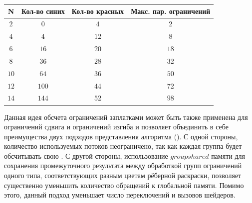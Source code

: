 		\noindent %
	\begin{minipage}{\textwidth}
		\vspace{\mfloatsep} %
		\centering\small
		\label{tab:chunkSize}
		\begin{tabular}{|c|c|c|c|}
			\hline
			\textbf{N} & \textbf{Кол-во синих} & \textbf{Кол-во красных} & \textbf{Макс. пар. ограничений}\\
			\hline
				$2$ & $0$ & $4$ & $2$\\ \hline
				$4$ & $4$ & $12$ & $8$\\ \hline
				$6$ & $16$ & $20$ & $18$\\ \hline
				$8$ & $36$ & $28$ & $32$\\ \hline
				$10$ & $64$ & $36$ & $50$\\ \hline
				$12$ & $100$ & $44$ & $72$\\ \hline
				$14$ & $144$ & $52$ & $98$\\ \hline
			
		\end{tabular}
		\vspace{\mfloatsep} %
		\normalsize %
	\end{minipage}
	
	Данная идея обсчета ограничений заплатками может быть также применена для ограничений сдвига и ограничений изгиба и позволяет объединить в себе преимущества двух подходов представления алгоритма (). С одной стороны, количество используемых потоков неограничено, так как каждая группа будет обсчитывать свою . С другой стороны, использование $groupshared$ памяти для сохранения промежуточного результата между обработкой групп ограничений одного типа, соответствующих разным цветам рёберной раскраски, позволяет существенно уменьшить количество обращений к глобальной памяти. Помимо этого, данный подход уменьшает число переключений и вызовов шейдеров.


%
